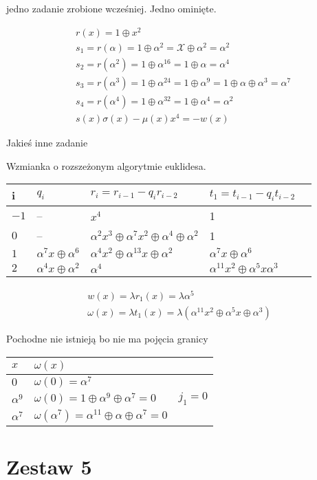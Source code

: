 \documentclass[12pt]{article}
\begin{document}
jedno zadanie zrobione wcześniej. Jedno ominięte.


\begin{multline*}
    & r(x) = 1 \oplus x^2 \\ 
    & s_1 = r(\alpha) = 1 \oplus \alpha^2  = \mathcal{X} \oplus \alpha ^2 = \alpha^2 \\
    & s_2 = r(\alpha^2) = 1\oplus \alpha ^{16} = 1\oplus \alpha = \alpha ^4  \\
    & s_3 = r(\alpha ^3) =1 \oplus \alpha ^{24} = 1\oplus \alpha^9 = 1 \oplus \alpha \oplus \alpha^3 = \alpha^7  \\
    & s_4 = r(\alpha^4) = 1\oplus \alpha ^{32} = 1 \oplus \alpha^4 = \alpha^2 \\
    & s(x)\sigma(x) - \mu(x)x^4 = - w(x)
\end{multline*}


Jakieś inne zadanie

Wzmianka o rozszeżonym algorytmie euklidesa. 

\begin{table}[h]
\begin{tabular}{lllll}
    i & $q_i$ & $r_i = r_{i-1} - q_ir_{i-2} $ & $t_1 = t_{i-1}-q_it_{i-2}$ &  \\ \hline
    $-1$ & --                           & $x^4$                                                         & 1 &    \\
    $0$  & --                           & $\alpha^2x^3\oplus\alpha^7x^2\oplus\alpha^4 \oplus \alpha^2 $ & 1  &    \\
    $1$  & $\alpha^7x \oplus \alpha^6 $ & $\alpha^4 x^2 \oplus \alpha ^{13}x \oplus \alpha ^2 $         & $\alpha^7x\oplus\alpha^6$  & \\  
    $2 $ & $\alpha^4x\oplus\alpha^2$    & $\alpha^4$                                                    & $\alpha^{11}x^2\oplus\alpha^5x\alpha^3$
\end{tabular}
\end{table}

\begin{multline*}
    & w(x) = \lambda r_1(x) = \lambda\alpha^5 & \\
    & \omega(x) = \lambda t_1(x)  = \lambda (\alpha^{11}x^2\oplus\alpha^5x\oplus \alpha^3) &
\end{multline*}

Pochodne nie istnieją bo nie ma pojęcia granicy 


\begin{table}[h]
\begin{tabular}{lll}
    $x$ & $\omega(x) $& \\ \hline
    $0$ & $ \omega(0)=\alpha^7$ &  \\
    $\alpha^9$ & $\omega(0) = 1 \oplus \alpha^9 \oplus \alpha^7 = 0 $ & $j_1=0$ \\
    $\alpha^7$ & $\omega(\alpha^7) = \alpha^11 \oplus \alpha \oplus \alpha^7 =0 $ & \\
\end{tabular}
\end{table}

\section*{Zestaw 5}
\end{document}
